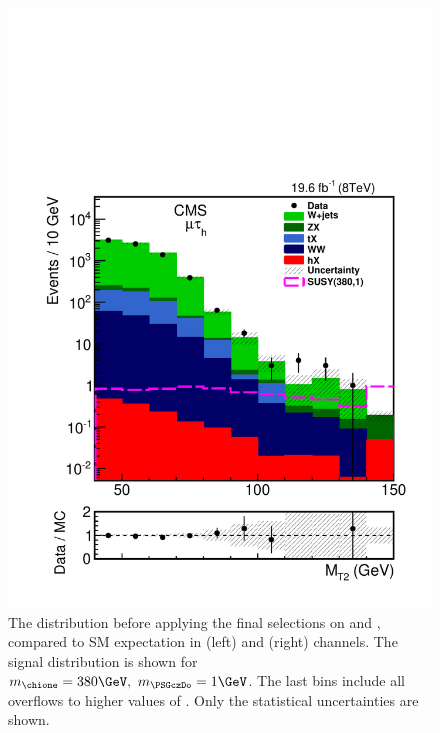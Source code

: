 \begin{figure}[!htb]
\includegraphics[angle=0,scale=0.375]{SelectionMuTau/MT2_mutau.pdf}
\caption{The \mttwo distribution before applying the final selections on \mttwo and \tauMT, compared to SM expectation in (left) \eTau and (right) \muTau channels. The signal distribution is shown for $m_{\chione}=380\GeV,~m_{\PSGczDo}=1\GeV$. The last bins include all overflows to higher values of \mttwo. Only the statistical uncertainties are shown.}
\label{fig:mt2leptontau}
\end{figure}






